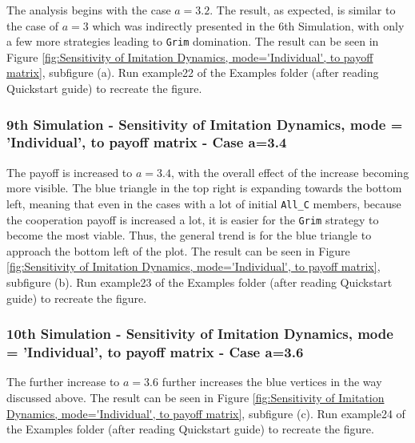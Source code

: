 The analysis begins with the case $a = 3.2$. The result, as expected, is similar to the case of $a=3$ which was indirectly presented in the 6th Simulation, with only a few more strategies leading to \texttt{Grim} domination. The result can be seen in Figure \ref{fig:Sensitivity of Imitation Dynamics, mode='Individual', to payoff matrix}, subfigure (a). Run example22 of the Examples folder (after reading Quickstart guide) to recreate the figure.

\subsubsection{9th Simulation - Sensitivity of Imitation Dynamics, mode = 'Individual', to payoff matrix - Case a=3.4}
The payoff is increased to $a=3.4$, with the overall effect of the increase becoming more visible. The blue triangle in the top right is expanding towards the bottom left, meaning that even in the cases with a lot of initial \texttt{All\_C} members, because the cooperation payoff is increased a lot, it is easier for the \texttt{Grim} strategy to become the most viable. Thus, the general trend is for the blue triangle to approach the bottom left of the plot. The result can be seen in Figure \ref{fig:Sensitivity of Imitation Dynamics, mode='Individual', to payoff matrix}, subfigure (b). Run example23 of the Examples folder (after reading Quickstart guide) to recreate the figure.

\subsubsection{10th Simulation - Sensitivity of Imitation Dynamics, mode = 'Individual', to payoff matrix - Case a=3.6}
The further increase to $a=3.6$ further increases the blue vertices in the way discussed above. The result can be seen in Figure \ref{fig:Sensitivity of Imitation Dynamics, mode='Individual', to payoff matrix}, subfigure (c). Run example24 of the Examples folder (after reading Quickstart guide) to recreate the figure.

